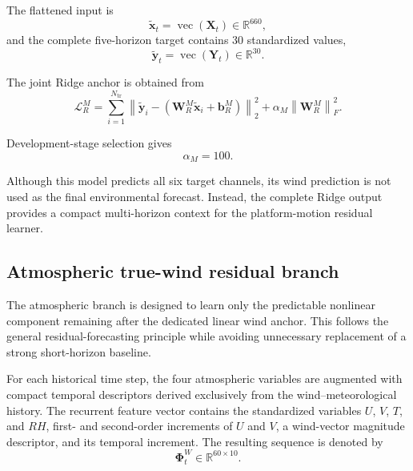 The flattened input is
\begin{equation}
\tilde{\mathbf x}_t
=
\operatorname{vec}
\left(
\mathbf X_t
\right)
\in
\mathbb R^{660},
\label{eq:joint_flat_input}
\end{equation}
and the complete five-horizon target contains 30 standardized values,
\begin{equation}
\tilde{\mathbf y}_t
=
\operatorname{vec}
\left(
\mathbf Y_t
\right)
\in
\mathbb R^{30}.
\label{eq:joint_flat_target}
\end{equation}

The joint Ridge anchor is obtained from
\begin{equation}
\mathcal L_R^M
=
\sum_{i=1}^{N_{\mathrm{tr}}}
\left\|
\tilde{\mathbf y}_i
-
\left(
\mathbf W_R^M
\tilde{\mathbf x}_i
+
\mathbf b_R^M
\right)
\right\|_2^2
+
\alpha_M
\left\|
\mathbf W_R^M
\right\|_F^2.
\label{eq:motion_ridge_loss}
\end{equation}

Development-stage selection gives
\begin{equation}
\alpha_M=100.
\label{eq:motion_ridge_alpha}
\end{equation}

Although this model predicts all six target channels, its wind prediction is not used as the final environmental forecast. Instead, the complete Ridge output provides a compact multi-horizon context for the platform-motion residual learner.

\subsection{Atmospheric true-wind residual branch}
\label{subsec:wind_residual}

The atmospheric branch is designed to learn only the predictable nonlinear component remaining after the dedicated linear wind anchor. This follows the general residual-forecasting principle while avoiding unnecessary replacement of a strong short-horizon baseline.

For each historical time step, the four atmospheric variables are augmented with compact temporal descriptors derived exclusively from the wind--meteorological history. The recurrent feature vector contains the standardized variables $U$, $V$, $T$, and $RH$, first- and second-order increments of $U$ and $V$, a wind-vector magnitude descriptor, and its temporal increment. The resulting sequence is denoted by
\begin{equation}
\boldsymbol{\Phi}_t^W
\in
\mathbb R^{60\times10}.
\label{eq:wind_features}
\end{equation}


